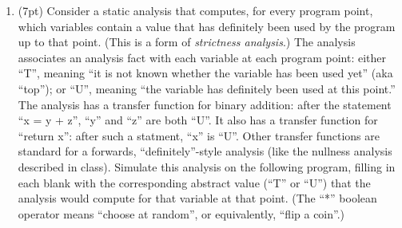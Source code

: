 \documentclass{report}
\newif\ifkey
\newcommand{\answerlong}[1]{\ifkey\color{red}\textbf{#1}\color{black}\else\vspace{0.5in}\fi\xspace}
\newcommand*{\pts}[1]{\addtocounter{points}{#1}(#1pt)}
\begin{document}
\begin{spacing}{1.4}
\begin{enumerate}[leftmargin=*]

\newpage

\item \pts{7} Consider a static analysis that computes, for every program point, which variables contain a value that has
  definitely been used by the program up to that point. (This is a form of \emph{strictness analysis}.) The analysis
  associates an analysis fact with each variable at each program point: either ``T'', meaning ``it is not known whether the
  variable has been used yet'' (aka ``top''); or ``U'', meaning ``the variable has definitely been used at this point.'' The analysis has
  a transfer function for binary addition: after the statement ``x = y + z'', ``y'' and ``z'' are both ``U''. It also has a
  transfer function for ``return x'': after such a statment, ``x'' is ``U''. Other transfer functions are standard for a forwards,
  ``definitely''-style analysis (like the nullness analysis described in class).
  Simulate this analysis on the following program, filling in each blank with the corresponding abstract value (``T'' or ``U'')
  that the analysis would compute for that variable at that point. (The ``*'' boolean operator means ``choose at random'', or equivalently, ``flip a coin''.)


\end{enumerate}
\end{spacing}
\end{document}

